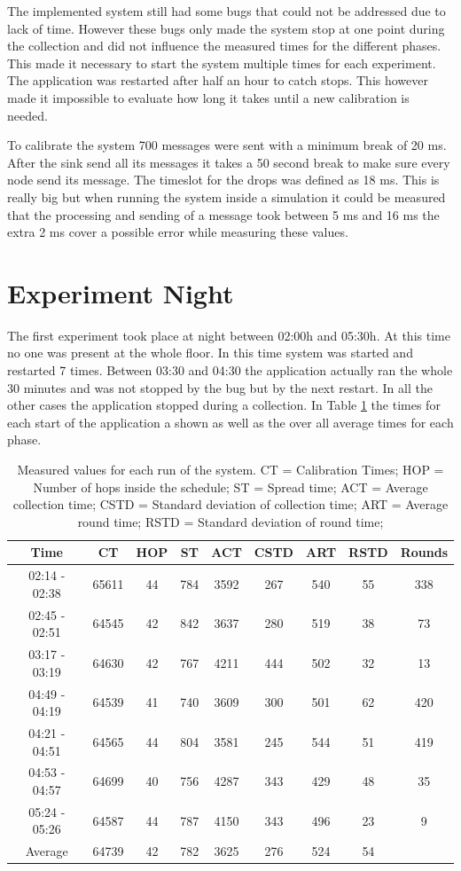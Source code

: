 The implemented system still had some bugs that could not be addressed due to lack of time. However these bugs only made the system stop at one point during the collection and did not influence the measured times for the different phases. This made it necessary to start the system multiple times for each experiment. The application was restarted after half an hour to catch stops. This however made it impossible to evaluate how long it takes until a new calibration is needed.

To calibrate the system 700 messages were sent with a minimum break of 20 ms. After the sink send all its messages it takes a 50 second break to make sure every node send its message. The timeslot for the drops was defined as 18 ms. This is really big but when running the system inside a simulation it could be measured that the processing and sending of a message took between 5 ms and 16 ms the extra 2 ms cover a possible error while measuring these values.  
\section{Experiment Night}
The first experiment took place at night between 02:00h and 05:30h. At this time no one was present at the whole floor. In this time system was started and restarted 7 times. Between 03:30 and 04:30 the application actually ran the whole 30 minutes and was not stopped by the bug but by the next restart. In all the other cases the application stopped during a collection. In Table \ref{tab:NightTable} the times for each start of the application a shown as well as the over all average times for each phase. 

\begin{table}[htbp]
 \caption{Measured values for each run of the system. CT = Calibration Times; HOP = Number of hops inside the schedule; ST = Spread time; ACT = Average collection time; CSTD = Standard deviation of collection time; ART = Average round time; RSTD = Standard deviation of round time;}
 \centering
 \begin{tabular}{c||c|c|c|c|c|c|c|c}
  Time & CT & HOP & ST & ACT & CSTD & ART & RSTD & Rounds\\ \toprule
  02:14 - 02:38 & 65611 & 44 & 784 & 3592 & 267 & 540 & 55 & 338\\
  02:45 - 02:51 & 64545 & 42 & 842 & 3637 & 280 & 519 & 38 & 73\\
  03:17 - 03:19 & 64630 & 42 & 767 & 4211 & 444 & 502 & 32 & 13\\
  04:49 - 04:19 & 64539 & 41 & 740 & 3609 & 300 & 501 & 62 & 420\\
  04:21 - 04:51 & 64565 & 44 & 804 & 3581 & 245 & 544 & 51 & 419\\
  04:53 - 04:57 & 64699 & 40 & 756 & 4287 & 343 & 429 & 48 & 35\\
  05:24 - 05:26 & 64587 & 44 & 787 & 4150 & 343 & 496 & 23 & 9\\ \toprule
  Average & 64739 & 42 & 782 & 3625 & 276 & 524 & 54 & \\
 \end{tabular}
 \label{tab:NightTable}
\end{table}

